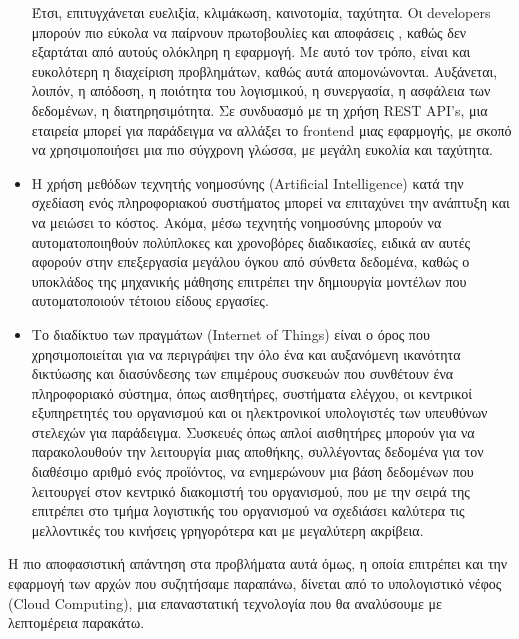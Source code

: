 \documentclass{article}
\begin{document}
\begin{itemize}
Έτσι, επιτυγχάνεται ευελιξία, κλιμάκωση, καινοτομία, ταχύτητα. Οι developers μπορούν πιο εύκολα να παίρνουν πρωτοβουλίες και αποφάσεις , καθώς δεν εξαρτάται από αυτούς ολόκληρη η εφαρμογή. Με αυτό τον τρόπο, είναι και ευκολότερη η διαχείριση προβλημάτων, καθώς αυτά απομονώνονται. Αυξάνεται, λοιπόν, η απόδοση, η ποιότητα του λογισμικού, η συνεργασία, η ασφάλεια των δεδομένων, η διατηρησιμότητα. 
Σε συνδυασμό με τη χρήση REST API's, μια εταιρεία μπορεί για παράδειγμα να αλλάξει το frontend μιας εφαρμογής, με σκοπό να χρησιμοποιήσει μια πιο σύγχρονη γλώσσα, με μεγάλη ευκολία και ταχύτητα.
\item Η χρήση μεθόδων τεχνητής νοημοσύνης (Artificial Intelligence) κατά την σχεδίαση ενός πληροφοριακού συστήματος μπορεί να επιταχύνει την ανάπτυξη και να μειώσει το κόστος. Ακόμα, μέσω τεχνητής νοημοσύνης μπορούν να αυτοματοποιηθούν πολύπλοκες και χρονοβόρες διαδικασίες, ειδικά αν αυτές αφορούν στην επεξεργασία μεγάλου όγκου από σύνθετα δεδομένα, καθώς ο υποκλάδος της μηχανικής μάθησης επιτρέπει την δημιουργία μοντέλων που αυτοματοποιούν τέτοιου είδους εργασίες.
\item Το διαδίκτυο των πραγμάτων  (Internet of Things)  είναι ο όρος που χρησιμοποιείται για να περιγράψει την όλο ένα και αυξανόμενη ικανότητα δικτύωσης και διασύνδεσης των επιμέρους συσκευών που συνθέτουν ένα πληροφοριακό σύστημα, όπως αισθητήρες, συστήματα ελέγχου, οι κεντρικοί εξυπηρετητές του οργανισμού και οι ηλεκτρονικοί υπολογιστές των υπευθύνων στελεχών για παράδειγμα. Συσκευές όπως απλοί αισθητήρες μπορούν για να παρακολουθούν την λειτουργία μιας αποθήκης, συλλέγοντας δεδομένα για τον διαθέσιμο αριθμό ενός προϊόντος, να ενημερώνουν μια βάση δεδομένων που λειτουργεί στον κεντρικό διακομιστή του οργανισμού, που με την σειρά της επιτρέπει στο τμήμα λογιστικής του οργανισμού να σχεδιάσει καλύτερα τις μελλοντικές του κινήσεις γρηγορότερα και με μεγαλύτερη ακρίβεια.


\end{itemize}
Η πιο αποφασιστική απάντηση στα προβλήματα αυτά όμως, η οποία επιτρέπει και την εφαρμογή των αρχών που συζητήσαμε παραπάνω, δίνεται από το υπολογιστικό νέφος (Cloud Computing), μια επαναστατική τεχνολογία που θα αναλύσουμε με λεπτομέρεια παρακάτω.
\end{document}
